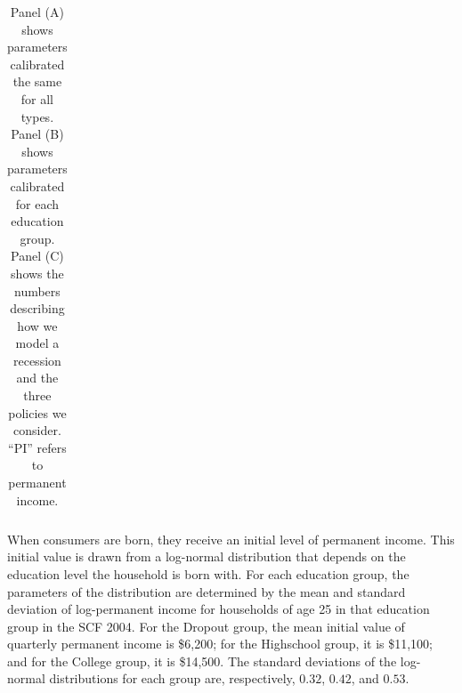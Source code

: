 \documentclass[../HAFiscal]{subfiles}
\begin{document}
{\begin{table}[p]
\begin{center}
\begin{tabular}{l}
\end{tabular}
\end{center}
\caption{Panel (A) shows parameters calibrated the same for all types. Panel (B) shows parameters calibrated for each education group. Panel (C) shows the numbers describing how we model a recession and the three policies we consider. ``PI'' refers to permanent income.}
\label{tab:calibration}
\end{table}
\clearpage
}


When consumers are born, they receive an initial level of permanent income. This initial value is drawn from a log-normal distribution that depends on the education level the household is born with. For each education group, the parameters of the distribution are determined by the mean and standard deviation of log-permanent income for households of age 25 in that education group in the SCF 2004. For the Dropout group, the mean initial value of quarterly permanent income is \$6,200; for the Highschool group, it is \$11,100; and for the College group, it is \$14,500. The standard deviations of the log-normal distributions for each group are, respectively, $0.32$, $0.42$, and $0.53$. 
\end{document}
